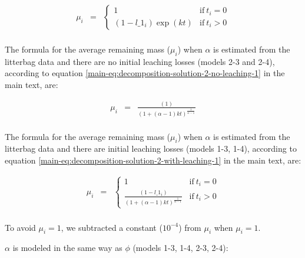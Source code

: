 \documentclass[
  12pt,
]{article}
\begin{document}
\begin{equation}
\begin{aligned}
\mu_i & = & \begin{cases} 
1 & \text{if}~t_i=0\\
(1 - l\_1_i) \exp(k t) & \text{if}~t_i>0
\end{cases}\\
\label{eq:sup-model-3}
\end{aligned}
\end{equation}

The formula for the average remaining mass (\(\mu_i\)) when \(\alpha\) is estimated from the litterbag data and there are no initial leaching losses (models 2-3 and 2-4), according to equation \ref{main-eq:decomposition-solution-2-no-leaching-1} in the main text, are:

\begin{equation}
\begin{aligned}
\mu_i & = & \frac{(1)}{(1 + (\alpha - 1) k t)^{\frac{1}{\alpha - 1}}}\\
\label{eq:sup-model-4}
\end{aligned}
\end{equation}

The formula for the average remaining mass (\(\mu_i\)) when \(\alpha\) is estimated from the litterbag data and there are initial leaching losses (models 1-3, 1-4), according to equation \ref{main-eq:decomposition-solution-2-with-leaching-1} in the main text, are:

\begin{equation}
\begin{aligned}
\mu_i & = & \begin{cases} 
1 & \text{if}~t_i=0\\
\frac{(1 - l\_1_i)}{(1 + (\alpha - 1) k t)^{\frac{1}{\alpha - 1}}} & \text{if}~t_i>0
\end{cases}\\
\label{eq:sup-model-5}
\end{aligned}
\end{equation}

To avoid \(\mu_i = 1\), we subtracted a constant (\ensuremath{10^{-4}}) from \(\mu_i\) when \(\mu_i = 1\).

\(\alpha\) is modeled in the same way as \(\phi\) (models 1-3, 1-4, 2-3, 2-4):
\end{document}
